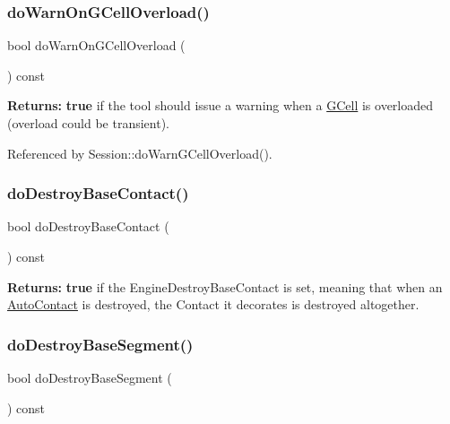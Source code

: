 \subsubsection{\texorpdfstring{do\+Warn\+On\+G\+Cell\+Overload()}{doWarnOnGCellOverload()}}
{\footnotesize\ttfamily bool do\+Warn\+On\+G\+Cell\+Overload (\begin{DoxyParamCaption}{ }\end{DoxyParamCaption}) const\hspace{0.3cm}{\ttfamily [inline]}}

{\bfseries Returns\+:} {\bfseries true} if the tool should issue a warning when a \mbox{\hyperlink{classKatabatic_1_1GCell}{G\+Cell}} is overloaded (overload could be transient). 

Referenced by Session\+::do\+Warn\+G\+Cell\+Overload().

\mbox{\label{classKatabatic_1_1KatabaticEngine_a6bb0ac3c0ec9720a3519d43491939f97}} 
\subsubsection{\texorpdfstring{do\+Destroy\+Base\+Contact()}{doDestroyBaseContact()}}
{\footnotesize\ttfamily bool do\+Destroy\+Base\+Contact (\begin{DoxyParamCaption}{ }\end{DoxyParamCaption}) const\hspace{0.3cm}{\ttfamily [inline]}}

{\bfseries Returns\+:} {\bfseries true} if the Engine\+Destroy\+Base\+Contact is set, meaning that when an \mbox{\hyperlink{classKatabatic_1_1AutoContact}{Auto\+Contact}} is destroyed, the Contact it decorates is destroyed altogether. \mbox{\label{classKatabatic_1_1KatabaticEngine_a54d58d645317d43371f6b0bec1815e6b}} 
\subsubsection{\texorpdfstring{do\+Destroy\+Base\+Segment()}{doDestroyBaseSegment()}}
{\footnotesize\ttfamily bool do\+Destroy\+Base\+Segment (\begin{DoxyParamCaption}{ }\end{DoxyParamCaption}) const\hspace{0.3cm}{\ttfamily [inline]}}

